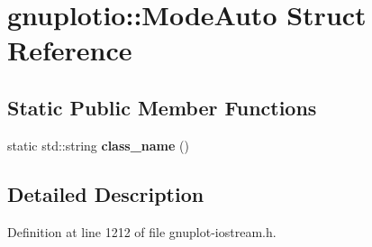\hypertarget{structgnuplotio_1_1_mode_auto}{}\section{gnuplotio\+:\+:Mode\+Auto Struct Reference}
\label{structgnuplotio_1_1_mode_auto}
\subsection*{Static Public Member Functions}
\begin{DoxyCompactItemize}
\item 
static std\+::string {\bfseries class\+\_\+name} ()\hypertarget{structgnuplotio_1_1_mode_auto_ac73f89a782ac32dd8bc7b8f7a7581523}{}\label{structgnuplotio_1_1_mode_auto_ac73f89a782ac32dd8bc7b8f7a7581523}

\end{DoxyCompactItemize}


\subsection{Detailed Description}


Definition at line 1212 of file gnuplot-\/iostream.\+h.


